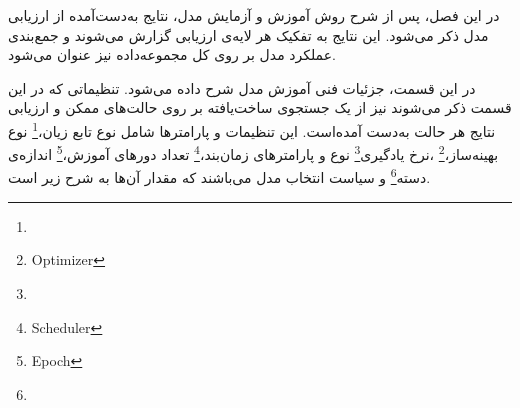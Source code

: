 

در این فصل، پس از شرح روش آموزش و آزمایش مدل، نتایج به‌دست‌آمده از ارزیابی مدل ذکر می‌شود.
این نتایج به تفکیک هر لایه‌ی ارزیابی گزارش می‌شوند و جمع‌بندی عملکرد مدل بر روی کل مجموعه‌داده نیز عنوان می‌شود.


در این قسمت، جزئیات فنی آموزش مدل شرح داده می‌شود.
تنظیماتی که در این قسمت ذکر می‌شوند نیز از یک جستجوی ساخت‌یافته بر روی حالت‌های ممکن و ارزیابی نتایج هر حالت به‌دست آمده‌است.
این تنظیمات و پارامترها شامل 
نوع تابع زیان،\footnote{}
نوع بهینه‌ساز،\footnote{Optimizer}
،نرخ یادگیری\footnote{}
نوع و پارامتر‌های زمان‌بند،\footnote{Scheduler}
تعداد دور‌های آموزش،\footnote{Epoch}
اندازه‌ی دسته\footnote{}
و 
سیاست انتخاب مدل می‌باشند که مقدار آن‌ها به شرح زیر است.

